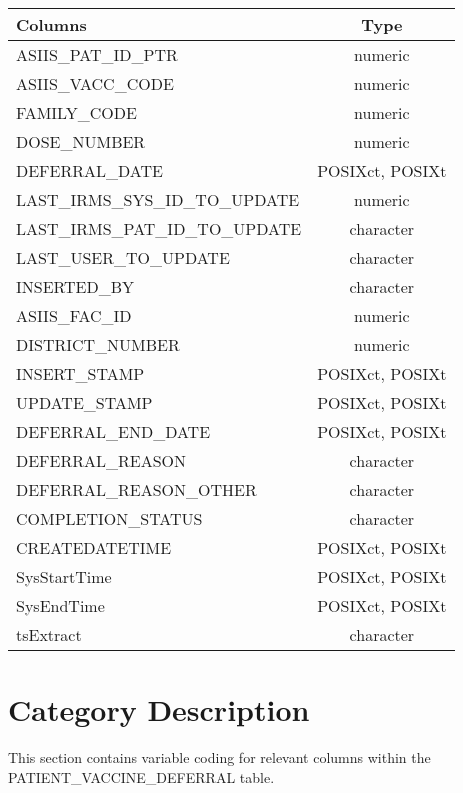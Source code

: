 \documentclass[
  letterpaper,
  DIV=11,
  numbers=noendperiod]{scrreprt}
\begin{document}
\begin{longtable}{lc}
\toprule
Columns & Type \\ 
\midrule
ASIIS\_PAT\_ID\_PTR & numeric \\ 
ASIIS\_VACC\_CODE & numeric \\ 
FAMILY\_CODE & numeric \\ 
DOSE\_NUMBER & numeric \\ 
DEFERRAL\_DATE & POSIXct, POSIXt \\ 
LAST\_IRMS\_SYS\_ID\_TO\_UPDATE & numeric \\ 
LAST\_IRMS\_PAT\_ID\_TO\_UPDATE & character \\ 
LAST\_USER\_TO\_UPDATE & character \\ 
INSERTED\_BY & character \\ 
ASIIS\_FAC\_ID & numeric \\ 
DISTRICT\_NUMBER & numeric \\ 
INSERT\_STAMP & POSIXct, POSIXt \\ 
UPDATE\_STAMP & POSIXct, POSIXt \\ 
DEFERRAL\_END\_DATE & POSIXct, POSIXt \\ 
DEFERRAL\_REASON & character \\ 
DEFERRAL\_REASON\_OTHER & character \\ 
COMPLETION\_STATUS & character \\ 
CREATEDATETIME & POSIXct, POSIXt \\ 
SysStartTime & POSIXct, POSIXt \\ 
SysEndTime & POSIXct, POSIXt \\ 
tsExtract & character \\ 
\bottomrule
\end{longtable}

\hypertarget{category-description-31}{%
\section*{Category Description}\label{category-description-31}}

This section contains variable coding for relevant columns within the
PATIENT\_VACCINE\_DEFERRAL table.
\end{document}

